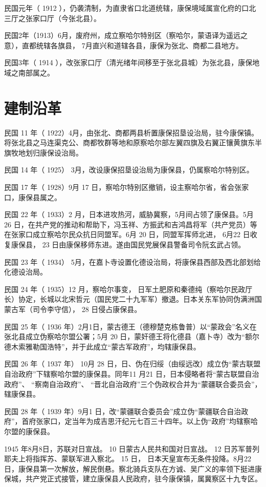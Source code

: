 民国元年（ 1912 ），仍袭清制，为直隶省口北道统辖，康保境域属宣化府的口北三厅之张家口厅（今张北县）。

民国2年（1913）6月，废府州，成立察哈尔特别区（察哈尔，蒙语译为遥远之意），直都统辖各旗县， 7月直兴和道辖各县，康保为张北、商都二县地方。

民国3年（ 1914 ），改张家口厅（清光绪年间移至于张北县城）为张北县，康保地域之南部属之。

\section{建制沿革}
民国 11 年（ 1922）4月，由张北、商都两县析置康保招垦设治局，驻今康保镇。将张北县之马连渠克公、商都牧群等地和原察哈尔部左翼四旗及右翼正镶黄旗东半旗牧地划归康保设治局。

民国 14 年（ 1925） 3月，改设康保招垦设治局为康保县，仍属察哈尔特别区。

民国 17 年（ 1928）9月 17 日，察哈尔特别区撤销，设主察哈尔省，省会张家口，康保县属之。

民国 22 年（ 1933）2 月，日本进攻热河，威胁冀察，5月间占领了康保县。5月 26 日，在共产党的推动和帮助下，冯玉祥、方振武和吉鸿昌将军（共产党员）等在张家口成立察哈尔民众抗日同盟军。6月 20 日，同盟军挥师北进， 6月22 日收复康保县， 23 日由康保移师东进。遂由国民党展保县警备司令阮玄武占领。

民国 23 年（ 1934） 5月，在嘉卜寺设置化德设治局，将康保县西部及西北部划给化德设治局。

民国 24 年（ 1935）12 月，察哈尔事变， 日军土肥原和秦德纯（察哈尔民政厅长）协定，长城以北宋哲元（国民党二十九军军）撤退。日本关东军协同伪满洲国蒙古军（司令李守信）， 28 日侵占康保县。

民国 25 年（ 1936 年）2月1日，蒙古德王（德穆楚克栋鲁普）以“蒙政会”名义在张北县成立伪察哈尔盟公署；5月 20 日，蒙奸德王将化德县（嘉卜寺）改为“额尔德木索雅勒国浩特”，并于此成立“蒙古军政府”，均辖康保县。

民国 26 年（ 1937 年） 10月 28 日，日、伪在归绥（由绥远改）成立伪“蒙古联盟自治政府”下辖察哈尔盟的康保县。同年11 月21 日，日本侵略者将“蒙古联盟自治政府”、 “察南自治政府”、 “晋北自治政府”三个伪政权合并为“蒙疆联合委员会”，辖康保县。

民国 28 年（ 1939 年）9月1 日，改“蒙疆联合委员会”成立伪“蒙疆联合自治政府”，首府张家口，定当年为成吉思汗纪元七百三十四年。以上伪“政府”均辖察哈尔盟的康保县。

1945 年8月8日，苏联对日宣战。 10 日蒙古人民共和国对日宣战。 12 日苏军普列耶夫上将指挥苏、蒙联军进入察北。 15 日， 日本天皇宣布无条件投降。8月22 日，康保县第一次解放，解民倒悬。察北骑兵支队在方诚、吴广义的率领下挺进康保城，共产党正式接管，建立康保县人民政府，驻今康保镇，属冀察区十九专区。

